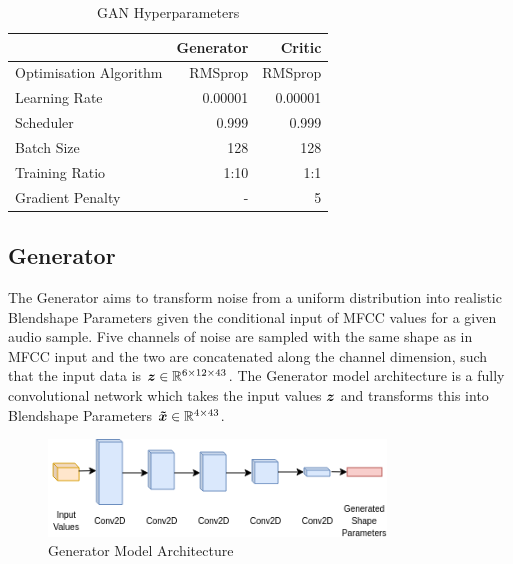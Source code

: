 \begin{table}[h!]
\centering
    \begin{tabular}{l | r | r}
    & \textbf{Generator} & \textbf{Critic}\\
    \hline
    Optimisation Algorithm & RMSprop & RMSprop \\
    Learning Rate          & 0.00001 & 0.00001 \\
    Scheduler              & 0.999   & 0.999   \\
    Batch Size             & 128     & 128     \\
    Training Ratio         & 1:10    & 1:1     \\
    Gradient Penalty       & -       & 5       \\
    \end{tabular} 
    \caption{GAN Hyperparameters}\label{table:gan_hyperparameters}
\end{table}

\subsection{Generator}
The Generator aims to transform noise from a uniform distribution into realistic Blendshape Parameters given the conditional input of MFCC values for a given audio sample.
Five channels of noise are sampled with the same shape as in MFCC input and the two are concatenated along the channel dimension, such that the input data is ${\boldsymbol{{z}}} \in \mathbb{R}^{6 \times 12 \times 43}$.
The Generator model architecture is a fully convolutional network which takes the input values ${\boldsymbol{{z}}}$ and transforms this into Blendshape Parameters ${\boldsymbol{{\tilde{x}}}} \in \mathbb{R}^{4 \times 43}$.

\begin{figure}[h!]
    \centering
        \includegraphics[width=0.8\textwidth]{figures/gan/generator.png}
    \caption{Generator Model Architecture}\label{fig:gan_gen_arch}
\end{figure}

